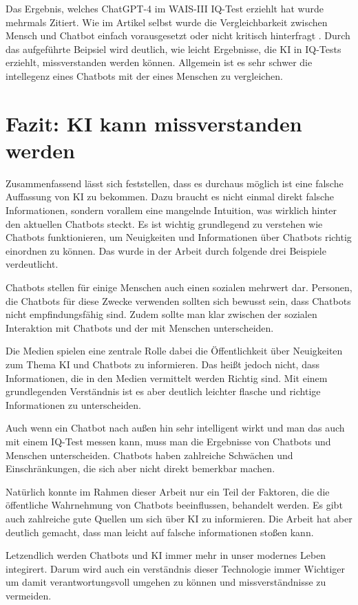 	Das Ergebnis, welches ChatGPT-4 im WAIS-III IQ-Test erziehlt hat wurde mehrmals Zitiert. Wie im Artikel selbst wurde die
	Vergleichbarkeit zwischen Mensch und Chatbot einfach vorausgesetzt \cite{gawdat23} oder nicht kritisch hinterfragt 
	\cite{blutermann23}. Durch das aufgeführte Beipsiel wird deutlich, wie leicht Ergebnisse, die KI in IQ-Tests erziehlt, missverstanden
	werden können. Allgemein ist es sehr schwer die intellegenz eines Chatbots mit der eines Menschen zu vergleichen. 
	
\clearpage
\section{Fazit: KI kann missverstanden werden}
Zusammenfassend lässt sich feststellen, dass es durchaus möglich ist eine falsche Auffassung von KI zu bekommen. Dazu braucht es nicht
einmal direkt falsche Informationen, sondern vorallem eine mangelnde Intuition, was wirklich hinter den aktuellen Chatbots steckt.
Es ist wichtig grundlegend zu verstehen wie Chatbots funktionieren, um Neuigkeiten und Informationen über Chatbots richtig einordnen zu können.   
Das wurde in der Arbeit durch folgende drei Beispiele verdeutlicht.

Chatbots stellen für einige Menschen auch einen sozialen mehrwert dar. Personen, die Chatbots für diese Zwecke verwenden sollten sich bewusst sein,
dass Chatbots nicht empfindungsfähig sind. Zudem sollte man klar zwischen der sozialen Interaktion mit Chatbots und der mit Menschen unterscheiden.

Die Medien spielen eine zentrale Rolle dabei die Öffentlichkeit über Neuigkeiten zum Thema KI und Chatbots zu informieren. Das heißt jedoch nicht,
dass Informationen, die in den Medien vermittelt werden Richtig sind. Mit einem grundlegenden Verständnis ist es aber deutlich leichter flasche und
richtige Informationen zu unterscheiden.     

Auch wenn ein Chatbot nach außen hin sehr intelligent wirkt und man das auch mit einem IQ-Test messen kann, muss man die Ergebnisse von Chatbots
und Menschen unterscheiden. Chatbots haben zahlreiche Schwächen und Einschränkungen, die sich aber nicht direkt bemerkbar machen. 

Natürlich konnte im Rahmen dieser Arbeit nur ein Teil der Faktoren, die die öffentliche Wahrnehmung von Chatbots beeinflussen, behandelt werden. 
Es gibt auch zahlreiche gute Quellen um sich über KI zu informieren. Die Arbeit hat aber deutlich gemacht, dass man leicht auf falsche informationen
stoßen kann.

Letzendlich werden Chatbots und KI immer mehr in unser modernes Leben integirert. Darum wird auch ein verständnis dieser Technologie immer Wichtiger
um damit verantwortungsvoll umgehen zu können und missverständnisse zu vermeiden. 


%